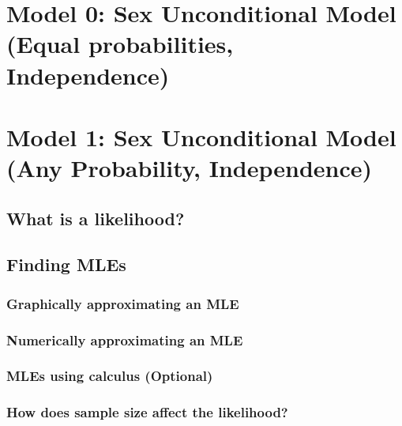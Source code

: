 \documentclass[
]{krantz}
\begin{document}
\hypertarget{model-0-sex-unconditional-model-equal-probabilities-independence}{%
\section{Model 0: Sex Unconditional Model (Equal probabilities, Independence)}\label{model-0-sex-unconditional-model-equal-probabilities-independence}}

\hypertarget{sex_unconditional_model}{%
\section{Model 1: Sex Unconditional Model (Any Probability, Independence)}\label{sex_unconditional_model}}

\hypertarget{what-is-a-likelihood}{%
\subsection{What is a likelihood?}\label{what-is-a-likelihood}}

\hypertarget{findMLE.sec}{%
\subsection{Finding MLEs}\label{findMLE.sec}}

\hypertarget{MLEgph.sec}{%
\subsubsection{Graphically approximating an MLE}\label{MLEgph.sec}}

\hypertarget{numerically-approximating-an-mle}{%
\subsubsection{Numerically approximating an MLE}\label{numerically-approximating-an-mle}}

\hypertarget{calc-sec}{%
\subsubsection{MLEs using calculus (Optional)}\label{calc-sec}}

\hypertarget{how-does-sample-size-affect-the-likelihood}{%
\subsubsection{How does sample size affect the likelihood?}\label{how-does-sample-size-affect-the-likelihood}}
\end{document}
